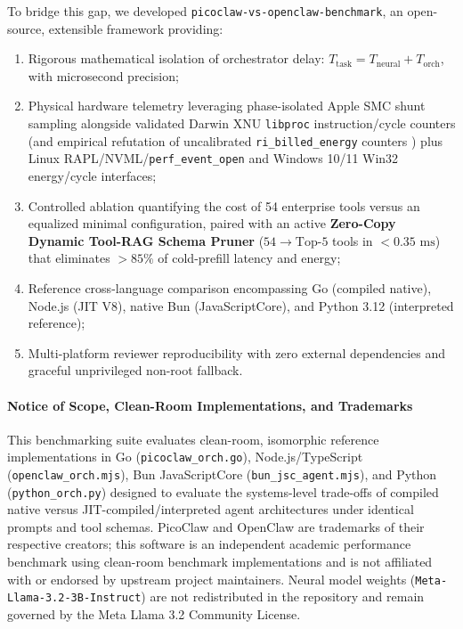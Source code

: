 \documentclass[preprint,12pt,3p]{elsarticle}
\begin{document}
To bridge this gap, we developed \texttt{picoclaw-vs-openclaw-benchmark}, an open-source, extensible framework providing:
\begin{enumerate}
    \item Rigorous mathematical isolation of orchestrator delay: $T_{\text{task}} = T_{\text{neural}} + T_{\text{orch}}$, with microsecond precision;
    \item Physical hardware telemetry leveraging phase-isolated Apple SMC shunt sampling alongside validated Darwin XNU \texttt{libproc} instruction/cycle counters (and empirical refutation of uncalibrated \texttt{ri\_billed\_energy} counters \cite{fahad2019comparative, weaver2013nondeterminism}) plus Linux RAPL/NVML/\texttt{perf\_event\_open} and Windows 10/11 Win32 energy/cycle interfaces;
    \item Controlled ablation quantifying the cost of 54 enterprise tools versus an equalized minimal configuration, paired with an active \textbf{Zero-Copy Dynamic Tool-RAG Schema Pruner} ($54 \rightarrow \text{Top-}5$ tools in $<0.35\text{ ms}$) that eliminates $>85\%$ of cold-prefill latency and energy;
    \item Reference cross-language comparison encompassing Go (compiled native), Node.js (JIT V8), native Bun (JavaScriptCore), and Python 3.12 (interpreted reference);
    \item Multi-platform reviewer reproducibility with zero external dependencies and graceful unprivileged non-root fallback.
\end{enumerate}

\paragraph{Notice of Scope, Clean-Room Implementations, and Trademarks}
This benchmarking suite evaluates clean-room, isomorphic reference implementations in Go (\texttt{picoclaw\_orch.go}), Node.js/TypeScript (\texttt{openclaw\_orch.mjs}), Bun JavaScriptCore (\texttt{bun\_jsc\_agent.mjs}), and Python (\texttt{python\_orch.py}) designed to evaluate the systems-level trade-offs of compiled native versus JIT-compiled/interpreted agent architectures under identical prompts and tool schemas. PicoClaw and OpenClaw are trademarks of their respective creators; this software is an independent academic performance benchmark using clean-room benchmark implementations and is not affiliated with or endorsed by upstream project maintainers. Neural model weights (\texttt{Meta-Llama-3.2-3B-Instruct}) are not redistributed in the repository and remain governed by the Meta Llama 3.2 Community License.
\end{document}
